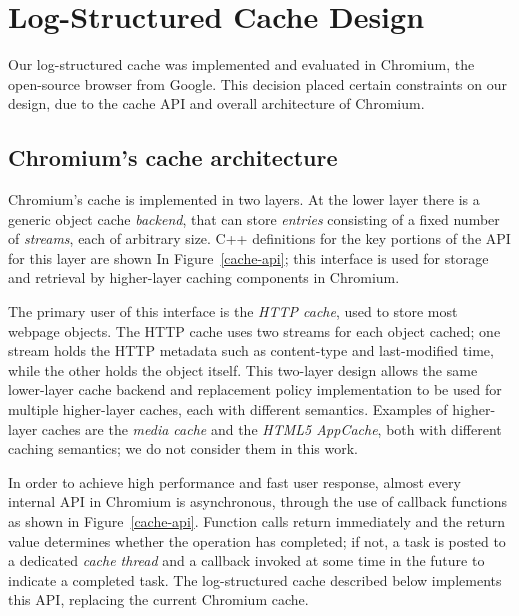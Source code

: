 \documentclass[letterpaper,twocolumn,10pt]{article}
\begin{document}
\section{Log-Structured Cache Design}

Our log-structured cache was implemented and evaluated in Chromium, the
open-source browser from Google.  This decision placed certain constraints on
our design, due to the cache API and overall architecture of Chromium.

\subsection{Chromium's cache architecture}

Chromium's cache is implemented in two layers.  At the lower layer there is a
generic object cache \emph{backend}, that can store \emph{entries} consisting of
a fixed number of \emph{streams}, each of arbitrary size.  C++ definitions for
the key portions of the API for this layer are shown In Figure~\ref{cache-api};
this interface is used for storage and retrieval by higher-layer caching
components in Chromium.

The primary user of this interface is the \emph{HTTP cache}, used to store most
webpage objects. The HTTP cache uses two streams for each object cached; one
stream holds the HTTP metadata such as content-type and last-modified time,
while the other holds the object itself.  This two-layer design allows the same
lower-layer cache backend and replacement policy implementation to be used for
multiple higher-layer caches, each with different semantics.  Examples of
higher-layer caches are the \emph{media cache} and the \emph{HTML5 AppCache},
both with different caching semantics; we do not consider them in this work.

In order to achieve high performance and fast user response, almost every
internal API in Chromium is asynchronous, through the use of callback functions
as shown in Figure~\ref{cache-api}.  Function calls return immediately and the
return value determines whether the operation has completed; if not, a task is
posted to a dedicated \emph{cache thread} and a callback invoked at some time in
the future to indicate a completed task.  The log-structured cache described
below implements this API, replacing the current Chromium cache.
\end{document}

